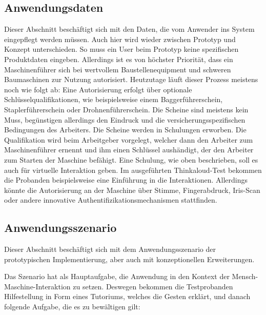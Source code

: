 \subsection{Anwendungsdaten}
Dieser Abschnitt beschäftigt sich mit den Daten, die vom Anwender ins System eingepflegt werden müssen. Auch hier wird wieder zwischen Prototyp und Konzept unterschieden. So muss ein User beim Prototyp keine spezifischen Produktdaten eingeben. Allerdings ist es von höchster Priorität, dass ein Maschinenführer sich bei wertvollem Baustellenequipment und schweren Baumaschinen zur Nutzung autorisiert. Heutzutage läuft dieser Prozess meistens noch wie folgt ab: Eine Autorisierung erfolgt über optionale Schlüsselqualifikationen, wie beispielsweise einem Baggerführerschein, Staplerführerschein oder Drohnenführerschein. Die Scheine sind meistens kein \frqq Muss\flqq, begünstigen allerdings den Eindruck und die versicherungsspezifischen Bedingungen des Arbeiters. Die Scheine werden in Schulungen erworben. Die Qualifikation wird beim Arbeitgeber vorgelegt, welcher dann den Arbeiter zum Maschinenführer ernennt und ihm einen Schlüssel aushändigt, der den Arbeiter zum Starten der Maschine befähigt. Eine Schulung, wie oben beschrieben, soll es auch für virtuelle Interaktion geben. Im ausgeführten Thinkaloud-Test bekommen die Probanden beispielsweise eine Einführung in die Interaktionen. Allerdings könnte die Autorisierung an der Maschine über Stimme, Fingerabdruck, Iris-Scan oder andere innovative Authentifizikationsmechanismen stattfinden.
\subsection{Anwendungsszenario}\label{ssec:applicationScenario}
Dieser Abschnitt beschäftigt sich mit dem Anwendungsszenario der prototypischen Implementierung, aber auch mit konzeptionellen Erweiterungen.

Das Szenario hat als Hauptaufgabe, die Anwendung in den Kontext der Mensch-Maschine-Interaktion zu setzen. Deswegen bekommen die Testprobanden Hilfestellung in Form eines Tutoriums, welches die Gesten erklärt, und danach folgende Aufgabe, die es zu bewältigen gilt:
